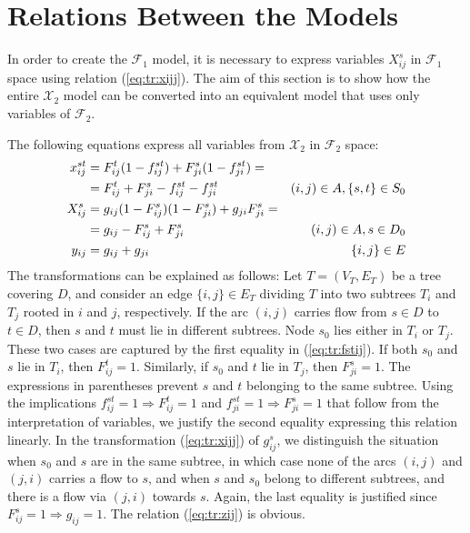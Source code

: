 \section{Relations Between the Models}
\label{sec:comp}

In order to create the $\mathcal{F}_1$ model, it is necessary to express variables  $X^s_{ij}$ in $\mathcal{F}_1$ space using relation (\ref{eq:tr:xijj}).
The aim of this section is to show how the entire $\mathcal{X}_2$ model can be converted into an equivalent model that uses only variables of $\mathcal{F}_2$.
 

The following equations express all variables from $\mathcal{X}_2$ in $\mathcal{F}_2$ space:
\begin{subequations}
\begin{align}
\notag\label{eq:tr:fstij}x^{st}_{ij}&=F^t_{ij}(1- f^{st}_{ij})+F^s_{ji}(1- f^{st}_{ji})= \\
  &=  F^t_{ij}+F^s_{ji} -  f^{st}_{ij} -  f^{st}_{ji}& (i,j)\in A, \{s,t\}\in S_0\\
\notag\label{eq:tr:xijj}X^s_{ij}&=g_{ij}(1-F^s_{ij})(1-F^s_{ji})+g_{ji}F^s_{ji}=\\
  &= g_{ij}-F^s_{ij} + F^s_{ji} & (i,j)\in A, s\in D_0\\
\label{eq:tr:zij}y_{ij}&=g_{ij}+g_{ji}& \{i,j\}\in E
\end{align}
\end{subequations}
The transformations can be explained as follows:
Let $T=(V_T,E_T)$ be a tree covering $D$, and consider an edge $\{i,j\}\in E_T$ dividing $T$ into two subtrees $T_i$ and $T_j$ rooted in $i$ and $j$, respectively.
If the arc $(i,j)$ carries flow from $s\in D$ to $t\in D$, then $s$ and $t$ must lie in different subtrees.
Node $s_0$ lies either in $T_i$ or $T_j$.
These two cases are captured by the first equality in (\ref{eq:tr:fstij}).
If both $s_0$ and $s$ lie in $T_i$, then $F^t_{ij}=1$.
Similarly, if $s_0$ and $t$ lie in $T_j$, then $F_{ji}^s=1$.
The expressions in parentheses prevent $s$ and $t$ belonging to the same subtree.
Using the implications $f^{st}_{ij}=1\Rightarrow F^t_{ij}=1$ and $f^{st}_{ji}=1\Rightarrow F_{ji}^s=1$ that follow from the interpretation of variables, we justify the second equality expressing this relation linearly.
In the transformation (\ref{eq:tr:xijj}) of $g_{ij}^s$, we distinguish the situation when $s_0$ and $s$ are in the same subtree, in which case none of the arcs $(i,j)$ and $(j,i)$ carries a flow to $s$, and when $s$ and $s_0$ belong to different subtrees, and there is a flow via $(j,i)$ towards $s$.
Again, the last equality is justified since $F_{ij}^s=1\Rightarrow g_{ij}=1$.
The relation (\ref{eq:tr:zij}) is obvious.

